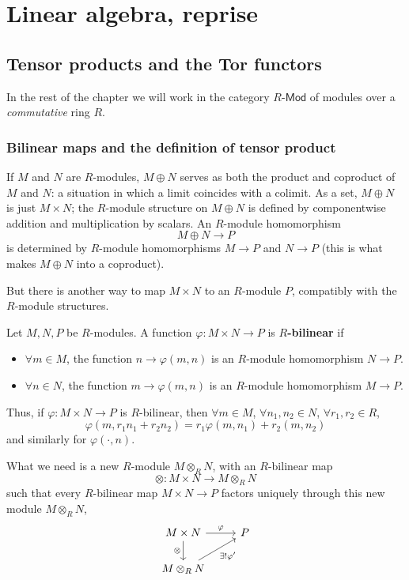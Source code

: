 \chapter{Linear algebra, reprise}
\section{Tensor products and the Tor functors}
In the rest of the chapter we will work in the category $R$-$\mathsf{Mod}$ of modules over a \textit{commutative} ring $R$.
\subsection{Bilinear maps and the definition of tensor product}
If $M$ and $N$ are $R$-modules, $M\oplus N$ serves as both the product and coproduct of $M$ and $N$: a situation in which a limit coincides with a colimit. As a set, $M\oplus N$ is just $M\times N$; the $R$-module structure on $M\oplus N$ is defined by componentwise addition and multiplication by scalars. An $R$-module homomorphism
\[M\oplus N\to P\]
is determined by $R$-module homomorphisms $M\to P$ and $N\to P$ (this is what makes $M\oplus N$ into a coproduct).\par
But there is another way to map $M\times N$ to an $R$-module $P$, compatibly with the $R$-module structures.
\begin{definition}
Let $M,N,P$ be $R$-modules. A function $\varphi:M\times N\to P$ is \textbf{$R$-bilinear} if
\begin{itemize}
\item $\forall m\in M$, the function $n\to\varphi(m,n)$ is an $R$-module homomorphism $N\to P$.
\item $\forall n\in N$, the function $m\to\varphi(m,n)$ is an $R$-module homomorphism $M\to P$.
\end{itemize}
\end{definition}
Thus, if $\varphi:M\times N\to P$ is $R$-bilinear, then $\forall m\in M$, $\forall n_1,n_2\in N$, $\forall r_1,r_2\in R$,
\[\varphi(m,r_1n_1+r_2n_2)=r_1\varphi(m,n_1)+r_2(m,n_2)\]
and similarly for $\varphi(\cdot,n)$.\par
What we need is a new $R$-module $M\otimes_{R}N$, with an $R$-bilinear map
\[\otimes:M\times N\to M\otimes_{R}N\]
such that every $R$-bilinear map $M\times N\to P$ factors uniquely through this new module $M\otimes_{R}N$,
\[\begin{tikzcd}
M\times N\ar[d,swap,"\otimes"]\ar[r,"\varphi"]&P\\
M\otimes_{R}N\ar[ru,swap,"\exists !\varphi'"]
\end{tikzcd}\]
